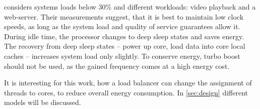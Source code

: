 \cite{le_sueur_slow_2011} considers systems loads below 30\% and different
workloads: video playback and a web-server.
Their measurements suggest, that it is best to maintain low clock speeds, as
long as the system load and quality of service guarantees allow it.
During idle time, the processor changes to deep sleep states and saves
energy.
The recovery from deep sleep states -- power up core, load data into core local
caches -- increases system load only slightly.
To conserve energy, turbo boost should not be used, as the gained frequency
comes at a high energy cost.

It is interesting for this work, how a load balancer can change the assignment
of threads to cores, to reduce overall energy consumption.
In \ref{sec:design} different models will be discussed.






